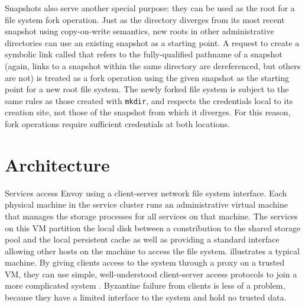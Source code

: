 Snapshots also serve another special purpose: they can be used as the root for a file system fork operation. Just as the \current directory diverges from its most recent snapshot using copy-on-write semantics, new \current roots in other administrative directories can use an existing snapshot as a starting point. A request to create a symbolic link called \current that refers to the fully-qualified pathname of a snapshot (again, links to a snapshot within the same directory are dereferenced, but others are not) is treated as a fork operation using the given snapshot as the starting point for a new root file system. The newly forked file system is subject to the same rules as those created with \texttt{mkdir}, and respects the credentials local to its creation site, not those of the snapshot from which it diverges. For this reason, fork operations require sufficient credentials at both locations.

\section{Architecture}

Services access Envoy using a client-server network file system interface. Each physical machine in the service cluster runs an administrative virtual machine that manages the storage processes for all services on that machine. The services on this VM partition the local disk between a constribution to the shared storage pool and the local persistent cache as well as providing a standard interface allowing other hosts on the machine to access the file system.  illustrates a typical machine. By giving clients access to the system through a proxy on a trusted VM, they can use simple, well-understood client-server access protocols to join a more complicated system \cite{shapiro}. Byzantine failure from clients is less of a problem, because they have a limited interface to the system and hold no trusted data.

